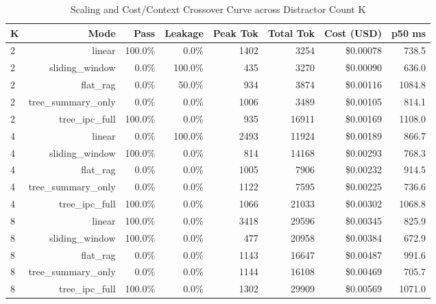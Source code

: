 \begin{table}[t]
\centering
\small
\begin{tabular}{lrrrrrrr}
\toprule
\textbf{K} & \textbf{Mode} & \textbf{Pass} & \textbf{Leakage} & \textbf{Peak Tok} & \textbf{Total Tok} & \textbf{Cost (USD)} & \textbf{p50 ms} \\
\midrule
2 & linear & 100.0\% & 0.0\% & 1402 & 3254 & \$0.00078 & 738.5 \\
2 & sliding\_window & 0.0\% & 100.0\% & 435 & 3270 & \$0.00090 & 636.0 \\
2 & flat\_rag & 0.0\% & 50.0\% & 934 & 3874 & \$0.00116 & 1084.8 \\
2 & tree\_summary\_only & 0.0\% & 0.0\% & 1006 & 3489 & \$0.00105 & 814.1 \\
2 & tree\_ipc\_full & 100.0\% & 0.0\% & 935 & 16911 & \$0.00169 & 1108.0 \\
4 & linear & 0.0\% & 100.0\% & 2493 & 11924 & \$0.00189 & 866.7 \\
4 & sliding\_window & 100.0\% & 0.0\% & 814 & 14168 & \$0.00293 & 768.3 \\
4 & flat\_rag & 0.0\% & 0.0\% & 1005 & 7906 & \$0.00232 & 914.5 \\
4 & tree\_summary\_only & 0.0\% & 0.0\% & 1122 & 7595 & \$0.00225 & 736.6 \\
4 & tree\_ipc\_full & 100.0\% & 0.0\% & 1066 & 21033 & \$0.00302 & 1068.8 \\
8 & linear & 100.0\% & 0.0\% & 3418 & 29596 & \$0.00345 & 825.9 \\
8 & sliding\_window & 100.0\% & 0.0\% & 477 & 20958 & \$0.00384 & 672.9 \\
8 & flat\_rag & 0.0\% & 0.0\% & 1143 & 16647 & \$0.00487 & 991.6 \\
8 & tree\_summary\_only & 0.0\% & 0.0\% & 1144 & 16108 & \$0.00469 & 705.7 \\
8 & tree\_ipc\_full & 100.0\% & 0.0\% & 1302 & 29909 & \$0.00569 & 1071.0 \\
\bottomrule
\end{tabular}
\caption{Scaling and Cost/Context Crossover Curve across Distractor Count K}
\label{tab:chatree-crossover}
\end{table}
